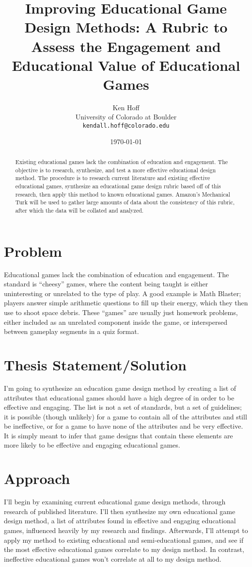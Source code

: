 \documentclass[12pt]{report}
\author{Ken Hoff \\ University of Colorado at Boulder \\ \texttt{kendall.hoff@colorado.edu} 
}
\date{\today}
\title{Improving Educational Game Design Methods: A Rubric to Assess the Engagement and Educational Value of Educational Games
}
\begin{document}
\maketitle

\begin{abstract}

Existing educational games lack the combination of education and engagement. The objective is to research, synthesize, and test a more effective educational design method. The procedure is to research current literature and existing effective educational games, synthesize an educational game design rubric based off of this research, then apply this method to known educational games. Amazon's Mechanical Turk will be used to gather large amounts of data about the consistency of this rubric, after which the data will be collated and analyzed.

\end{abstract}

\tableofcontents
\listoffigures

\section{Problem}
	Educational games lack the combination of education and engagement. The standard is “cheesy” games, where the content being taught is either uninteresting or unrelated to the type of play. A good example is Math Blaster; players answer simple arithmetic questions to fill up their energy, which they then use to shoot space debris. These “games” are usually just homework problems, either included as an unrelated component inside the game, or interspersed between gameplay segments in a quiz format.

\section{Thesis Statement/Solution}
	I'm going to synthesize an education game design method by creating a list of attributes that educational games should have a high degree of in order to be effective and engaging. The list is not a set of standards, but a set of guidelines; it is possible (though unlikely) for a game to contain all of the attributes and still be ineffective, or for a game to have none of the attributes and be very effective. It is simply meant to infer that game designs that contain these elements are more likely to be effective and engaging educational games.

\section{Approach} 
	I'll begin by examining current educational game design methods, through research of published literature. I'll then synthesize my own educational game design method, a list of attributes found in effective and engaging educational games, influenced heavily by my research and findings. Afterwards, I'll attempt to apply my method to existing educational and semi-educational games, and see if the most effective educational games correlate to my design method. In contrast, ineffective educational games won't correlate at all to my design method.
\end{document}
